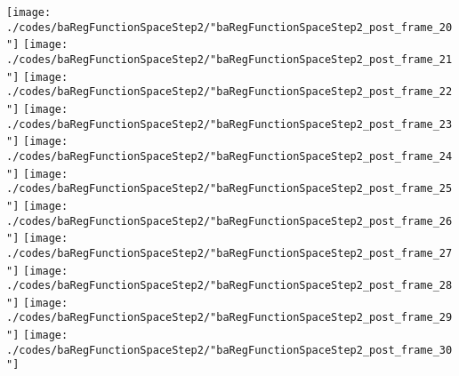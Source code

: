 \begin{frame}{\insertsection}
\begin{center}
{\begin{animateinline}{15}
				 \texttt{[image: ./codes/baRegFunctionSpaceStep2/"baRegFunctionSpaceStep2\_post\_frame\_20"]}\newframe
				 \texttt{[image: ./codes/baRegFunctionSpaceStep2/"baRegFunctionSpaceStep2\_post\_frame\_21"]}\newframe
				 \texttt{[image: ./codes/baRegFunctionSpaceStep2/"baRegFunctionSpaceStep2\_post\_frame\_22"]}\newframe
				 \texttt{[image: ./codes/baRegFunctionSpaceStep2/"baRegFunctionSpaceStep2\_post\_frame\_23"]}\newframe
				 \texttt{[image: ./codes/baRegFunctionSpaceStep2/"baRegFunctionSpaceStep2\_post\_frame\_24"]}\newframe
				 \texttt{[image: ./codes/baRegFunctionSpaceStep2/"baRegFunctionSpaceStep2\_post\_frame\_25"]}\newframe
				 \texttt{[image: ./codes/baRegFunctionSpaceStep2/"baRegFunctionSpaceStep2\_post\_frame\_26"]}\newframe
				 \texttt{[image: ./codes/baRegFunctionSpaceStep2/"baRegFunctionSpaceStep2\_post\_frame\_27"]}\newframe
				 \texttt{[image: ./codes/baRegFunctionSpaceStep2/"baRegFunctionSpaceStep2\_post\_frame\_28"]}\newframe
				 \texttt{[image: ./codes/baRegFunctionSpaceStep2/"baRegFunctionSpaceStep2\_post\_frame\_29"]}\newframe
				 \texttt{[image: ./codes/baRegFunctionSpaceStep2/"baRegFunctionSpaceStep2\_post\_frame\_30"]}
			 \end{animateinline}
			}
	\end{center}
    
\end{frame}

